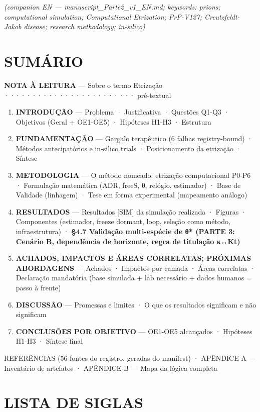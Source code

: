 \documentclass[
  12pt,
]{report}
\providecommand{\tightlist}{%
  \setlength{\itemsep}{0pt}\setlength{\parskip}{0pt}}
\begin{document}
\emph{(companion EN --- manuscript\_Parte2\_v1\_EN.md; keywords: prions;
computational simulation; Computational Etrization; PrP-V127;
Creutzfeldt-Jakob disease; research methodology; in-silico)}

\hypertarget{sumuxe1rio}{%
\section{SUMÁRIO}\label{sumuxe1rio}}

\textbf{NOTA À LEITURA} --- Sobre o termo Etrização
························ pré-textual

\begin{enumerate}
\def\labelenumi{\arabic{enumi}.}
\tightlist
\item
  \textbf{INTRODUÇÃO} --- Problema · Justificativa · Questões Q1-Q3 ·
  Objetivos (Geral + OE1-OE5) · Hipóteses H1-H3 · Estrutura
\item
  \textbf{FUNDAMENTAÇÃO} --- Gargalo terapêutico (6 falhas
  registry-bound) · Métodos antecipatórios e in-silico trials ·
  Posicionamento da etrização · Síntese
\item
  \textbf{METODOLOGIA} --- O método nomeado: etrização computacional
  P0-P6 · Formulação matemática (ADR, freeS, θ, relógio, estimador) ·
  Base de Validade (linhagem) · Tese em forma experimental (mapeamento
  análogo)
\item
  \textbf{RESULTADOS} --- Resultados {[}SIM{]} da simulação realizada ·
  Figuras · Componentes (estimador, freeze dormant, loop, seleção como
  método, infraestrutura) · \textbf{§4.7 Validação multi-espécie de θ*
  (PARTE 3: Cenário B, dependência de horizonte, regra de titulação
  κ↔Kt)}
\item
  \textbf{ACHADOS, IMPACTOS E ÁREAS CORRELATAS; PRÓXIMAS ABORDAGENS} ---
  Achados · Impactos por camada · Áreas correlatas · Declaração
  mandatória (base simulada + lab necessário + dados humanos = passo à
  frente)
\item
  \textbf{DISCUSSÃO} --- Promessas e limites · O que os resultados
  significam e não significam
\item
  \textbf{CONCLUSÕES POR OBJETIVO} --- OE1-OE5 alcançados · Hipóteses
  H1-H3 · Síntese final
\end{enumerate}

REFERÊNCIAS (56 fontes do registro, geradas do manifest) · APÊNDICE A
--- Inventário de artefatos · APÊNDICE B --- Mapa da lógica completa

\hypertarget{lista-de-siglas}{%
\section{LISTA DE SIGLAS}\label{lista-de-siglas}}
\end{document}
